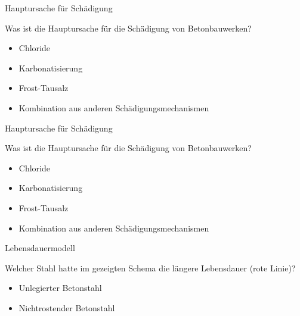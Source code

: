 \begin{frame}{Hauptursache für Schädigung}
    \begin{Fragenblock}
        Was ist die Hauptursache für die Schädigung von Betonbauwerken?
        
        \begin{itemize}
            \item[\faSquare] Chloride
            \item[\faSquare] Karbonatisierung
            \item[\faSquare] Frost-Tausalz
            \item[\faSquare] Kombination aus anderen Schädigungsmechanismen
        \end{itemize}
        
    \end{Fragenblock}
\end{frame}
    
\begin{frame}{Hauptursache für Schädigung}
    \begin{Fragenblock}
        Was ist die Hauptursache für die Schädigung von Betonbauwerken?
        
        \begin{itemize}
            \item[\textcolor{green!70!black}{\faCheckSquare}] Chloride
            \item[\faSquare] Karbonatisierung
            \item[\faSquare] Frost-Tausalz
            \item[\faSquare] Kombination aus anderen Schädigungsmechanismen
        \end{itemize}
        
    \end{Fragenblock}
\end{frame}

\begin{frame}{Lebensdauermodell}
    \begin{Fragenblock}
        Welcher Stahl hatte im gezeigten Schema die längere Lebensdauer (rote Linie)?
        
        \begin{itemize}
            \item[\faSquare] Unlegierter Betonstahl
            \item[\faSquare] Nichtrostender Betonstahl
        \end{itemize}
        
    \end{Fragenblock}
\end{frame}
    

